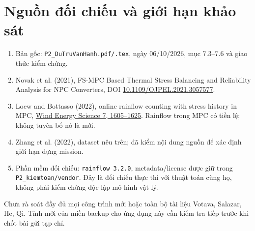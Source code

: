 \documentclass[11pt,a4paper]{article}
\begin{document}
\section*{Nguồn đối chiếu và giới hạn khảo sát}
\begin{enumerate}
\item Bản gốc: \texttt{P2\_DuTruVanHanh.pdf/.tex}, ngày 06/10/2026, mục 7.3--7.6 và giao thức kiểm chứng.
\item Novak et al. (2021), FS-MPC Based Thermal Stress Balancing and Reliability Analysis for NPC Converters, DOI \href{https://doi.org/10.1109/OJPEL.2021.3057577}{10.1109/OJPEL.2021.3057577}.
\item Loew and Bottasso (2022), online rainflow counting with stress history in MPC, \href{https://wes.copernicus.org/articles/7/1605/2022/}{Wind Energy Science 7, 1605--1625}. Rainflow trong MPC có tiền lệ; không tuyên bố nó là mới.
\item Zhang et al. (2022), dataset nêu trên; đã kiểm nội dung nguồn để xác định giới hạn dựng mission.
\item Phần mềm đối chiếu: \texttt{rainflow 3.2.0}, metadata/license được giữ trong \texttt{P2\_kiemtoan/vendor}. Đây là đối chiếu thực thi với thuật toán cùng họ, không phải kiểm chứng độc lập mô hình vật lý.
\end{enumerate}
Chưa rà soát đầy đủ mọi công trình mới hoặc toàn bộ tài liệu Votava, Salazar, He, Qi. Tính mới của miền backup cho ứng dụng này cần kiểm tra tiếp trước khi chốt bài gửi tạp chí.
\end{document}
